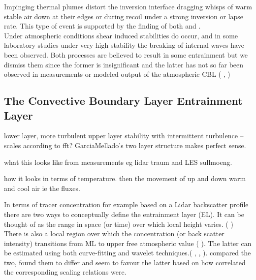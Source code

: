 Impinging thermal plumes distort the inversion interface dragging whisps of warm stable air down
at their edges or during recoil under a strong inversion or lapse rate. This type of event is supported 
by the finding  of both  \cite{SullMoengStev} and \citeauthor{Traum11} \cite{Traum11}.\\

Under atmospheric conditions shear induced stabilities do occur, and in some laboratory studies 
under very high stability the breaking of internal waves have been observed.  Both processes are 
believed to result in some entrainment but we dismiss them since the former is insignificant 
 and the latter has not so far been observed in measurements or modeled output of the 
atmospheric \acs{CBL} (\citeauthor{Traum11} \cite{Traum11},  \cite{SullMoengStev})

\subsection{The Convective Boundary Layer Entrainment Layer}
\label{subsec:}

lower layer, more turbulent upper layer stability with intermittent turbulence --scales according to fft?
GarciaMellado's two layer structure makes perfect sense.

what this looks like from measurements eg lidar traum and LES sullmoeng.

how it looks in terms of temperature.  then the movement of up and down warm and cool air ie the 
fluxes.

In terms of tracer concentration for example based on a Lidar backscatter profile there are two ways to conceptually
define the entrainment layer (\acs{EL}).  It can be thought of as the range in space (or time) over which local height
varies. (\citeauthor{CrumStullEl} \cite{CrumStullEl}) There is also a local region over which the concentration (or back
scatter intensity) transitions from \acs{ML} to upper free atmospheric value (\citeauthor{Traum11} \cite{Traum11}).  The latter
can be estimated using both curve-fitting and wavelet techniques.(\citeauthor{Traum11} \cite{Traum11}, \citeauthor{SteynBaldHoff} 
\cite{SteynBaldHoff}, \citeauthor{BrooksFowler2} \cite{BrooksFowler2}). \citeauthor{Traum11} \cite{Traum11} compared the
two, found them to differ and seem to favour the latter based on how correlated the corresponding scaling relations were.\\


